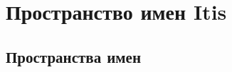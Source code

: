 \hypertarget{namespace_itis}{}\section{Пространство имен Itis}
\label{namespace_itis}
\subsection*{Пространства имен}
\begin{DoxyCompactItemize}
\end{DoxyCompactItemize}
